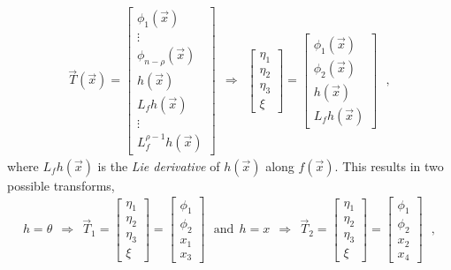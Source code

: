 \begin{align}
  \vec{T}(\vec{x})
  =
  \begin{bmatrix}
    \phi_1(\vec{x})         \\
    \vdots                  \\
    \phi_{n-\rho}(\vec{x})  \\
    h(\vec{x})              \\
    L_f h(\vec{x})          \\
    \vdots                  \\
    L_f^{\rho-1} h(\vec{x})
  \end{bmatrix}
  \ \ \Rightarrow \ \ 
  \begin{bmatrix}
  \eta_1   \\
  \eta_2   \\
  \eta_3   \\
  \xi
  \end{bmatrix}
  =
  \begin{bmatrix}
  \phi_1(\vec{x})   \\
  \phi_2(\vec{x})   \\
  h(\vec{x})        \\
  L_f h(\vec{x})
  \end{bmatrix} \ \ \ ,
  \label{eq:transformPhi} 
\end{align}
%
where $L_f h(\vec{x})$ is the \textit{Lie derivative} of $h(\vec{x})$ along $f(\vec{x})$. This results in two possible transforms, 
\begin{align}
h = \theta \ \ \Rightarrow \ \ 
  \vec{T}_1 =
  \begin{bmatrix}
  \eta_1  \\
  \eta_2  \\
  \eta_3  \\
  \xi
  \end{bmatrix}
  =
  \begin{bmatrix}
  \phi_1  \\
  \phi_2  \\
  x_1     \\
  x_3
  \end{bmatrix} \ \ \ \mathrm{and}\ \ h = x \ \ \Rightarrow \ \
  \vec{T}_2 =
  \begin{bmatrix}
  \eta_1   \\
  \eta_2   \\
  \eta_3   \\
  \xi
  \end{bmatrix}
  =
  \begin{bmatrix}
  \phi_1  \\
  \phi_2  \\
  x_2     \\
  x_4
  \end{bmatrix} \ \ \ ,
\end{align}
